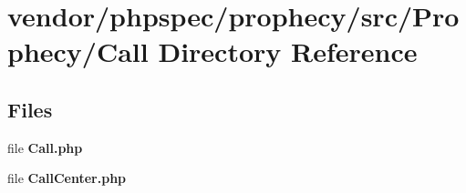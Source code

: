 \section{vendor/phpspec/prophecy/src/\+Prophecy/\+Call Directory Reference}
\label{dir_bd08313487e7c836d128701f2ef0e796}
\subsection*{Files}
\begin{DoxyCompactItemize}
\item 
file {\bf Call.\+php}
\item 
file {\bf Call\+Center.\+php}
\end{DoxyCompactItemize}
